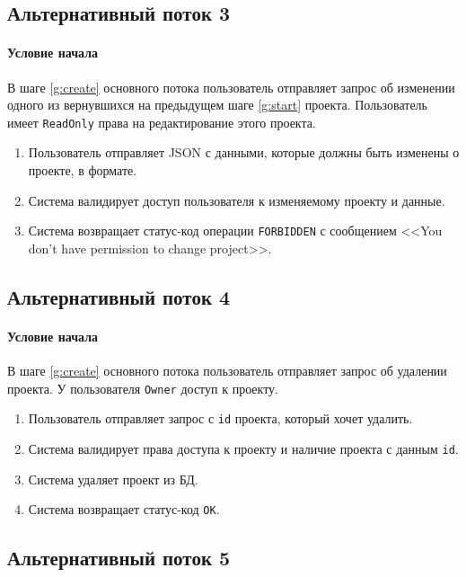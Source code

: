 \documentclass[a4paper,12pt]{article}
\begin{document}
\subsection*{Альтернативный поток 3}

\paragraph*{Условие начала} В шаге \ref{g:create} основного потока пользователь отправляет запрос об изменении одного из вернувшихся на предыдущем шаге \ref{g:start} проекта. Пользователь имеет \texttt{ReadOnly} права на редактирование этого проекта.

\begin{enumerate}
    \def\labelenumi{\arabic{enumi}.}
    \item Пользователь отправляет JSON с данными, которые должны быть изменены о проекте, в формате. 
    \item Система валидирует доступ пользователя к изменяемому проекту и данные.
    \item Система возвращает статус-код операции \texttt{FORBIDDEN} с сообщением <<You don't have permission to change project>>.
\end{enumerate}

\subsection*{Альтернативный поток 4}

\paragraph*{Условие начала} В шаге \ref{g:create} основного потока пользователь отправляет запрос об удалении проекта. У пользователя \texttt{Owner} доступ к проекту.

\begin{enumerate}
    \def\labelenumi{\arabic{enumi}.}
    \item Пользователь отправляет запрос с \texttt{id} проекта, который хочет удалить.
    \item Система валидирует права доступа к проекту и наличие проекта с данным \texttt{id}.
    \item Система удаляет проект из БД.
    \item Система возвращает статус-код \texttt{OK}.
\end{enumerate}

\subsection*{Альтернативный поток 5}
\end{document}
